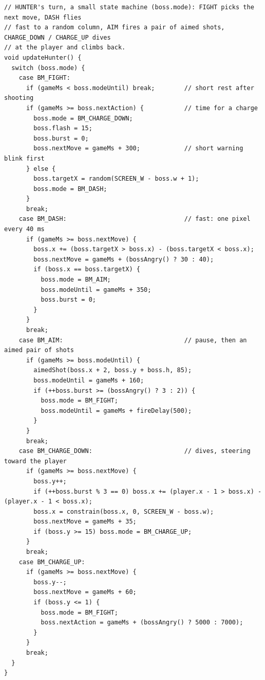 \documentclass[11pt,a4paper]{article}
\begin{document}
\begin{latin}
\begin{lstlisting}[language=Arduino]
// HUNTER's turn, a small state machine (boss.mode): FIGHT picks the next move, DASH flies
// fast to a random column, AIM fires a pair of aimed shots, CHARGE_DOWN / CHARGE_UP dives
// at the player and climbs back.
void updateHunter() {
  switch (boss.mode) {
    case BM_FIGHT:
      if (gameMs < boss.modeUntil) break;        // short rest after shooting
      if (gameMs >= boss.nextAction) {           // time for a charge
        boss.mode = BM_CHARGE_DOWN;
        boss.flash = 15;
        boss.burst = 0;
        boss.nextMove = gameMs + 300;            // short warning blink first
      } else {
        boss.targetX = random(SCREEN_W - boss.w + 1);
        boss.mode = BM_DASH;
      }
      break;
    case BM_DASH:                                // fast: one pixel every 40 ms
      if (gameMs >= boss.nextMove) {
        boss.x += (boss.targetX > boss.x) - (boss.targetX < boss.x);
        boss.nextMove = gameMs + (bossAngry() ? 30 : 40);
        if (boss.x == boss.targetX) {
          boss.mode = BM_AIM;
          boss.modeUntil = gameMs + 350;
          boss.burst = 0;
        }
      }
      break;
    case BM_AIM:                                 // pause, then an aimed pair of shots
      if (gameMs >= boss.modeUntil) {
        aimedShot(boss.x + 2, boss.y + boss.h, 85);
        boss.modeUntil = gameMs + 160;
        if (++boss.burst >= (bossAngry() ? 3 : 2)) {
          boss.mode = BM_FIGHT;
          boss.modeUntil = gameMs + fireDelay(500);
        }
      }
      break;
    case BM_CHARGE_DOWN:                         // dives, steering toward the player
      if (gameMs >= boss.nextMove) {
        boss.y++;
        if (++boss.burst % 3 == 0) boss.x += (player.x - 1 > boss.x) - (player.x - 1 < boss.x);
        boss.x = constrain(boss.x, 0, SCREEN_W - boss.w);
        boss.nextMove = gameMs + 35;
        if (boss.y >= 15) boss.mode = BM_CHARGE_UP;
      }
      break;
    case BM_CHARGE_UP:
      if (gameMs >= boss.nextMove) {
        boss.y--;
        boss.nextMove = gameMs + 60;
        if (boss.y <= 1) {
          boss.mode = BM_FIGHT;
          boss.nextAction = gameMs + (bossAngry() ? 5000 : 7000);
        }
      }
      break;
  }
}


\end{lstlisting}
\end{latin}
\end{document}
